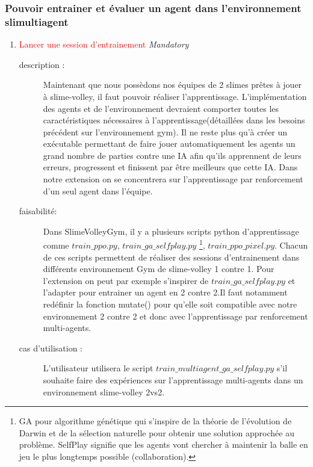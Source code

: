 \documentclass[11pt, a4paper]{article}
\newcommand{\besoinVItem}[4]{
	\item #1
	\begin{description}
		\item[description :]
		#2
		\item[faisabilité: ]
		#3
		\item[cas d'utilisation :]
		#4
	\end{description}
}
\begin{document}
	\subsubsection{Pouvoir entrainer et évaluer un agent dans l'environnement slimultiagent}
	\begin{enumerate}

		\besoinVItem{\textcolor{red}{Lancer une session d'entrainement }\textit{Mandatory}}
		{
			Maintenant que nous possèdons nos équipes de 2 slimes prêtes à jouer à slime-volley, il faut pouvoir réaliser l'apprentissage. L'implémentation des agents et de l'environnement devraient comporter toutes les caractéristiques nécessaires à l'apprentissage(détaillées dans les besoins précédent sur l'environnement gym). Il ne reste plus qu'à créer un exécutable permettant de faire jouer automatiquement les agents un grand nombre de parties contre une IA afin qu'ils apprennent de leurs erreurs, progressent et finissent par être meilleurs que cette IA. Dans notre extension on se concentrera sur l'apprentissage par renforcement d'un seul agent dans l'équipe.\label{session}
		}
		{
			Dans SlimeVolleyGym, il y a plusieurs scripts python d'apprentissage comme $train\_ppo.py$, $train\_ga\_selfplay.py$ \footnote{GA pour algorithme génétique qui s'inspire de la théorie de l'évolution de Darwin et de la sélection naturelle pour obtenir une solution approchée au problème. SelfPlay signifie que les agents vont chercher à maintenir la balle en jeu le plus longtemps possible (collaboration).}, $train\_ppo\_pixel.py$. Chacun de ces scripts permettent de réaliser  des sessions d'entrainement dans différents environnement Gym de slime-volley 1 contre 1. Pour l'extension on peut par exemple s'inspirer de $train\_ga\_selfplay.py$ et l'adapter pour entrainer un agent en 2 contre 2.Il faut notamment redéfinir la fonction mutate() pour qu'elle soit compatible avec notre environnement 2 contre 2 et donc avec l'apprentissage par renforcement multi-agents.
		}
		{
			L'utilisateur utilisera le script $train\_multiagent\_ga\_selfplay.py$ s'il souhaite faire des expériences sur l'apprentissage multi-agents dans un environnement slime-volley 2vs2.
		}


\end{enumerate}
\end{document}
